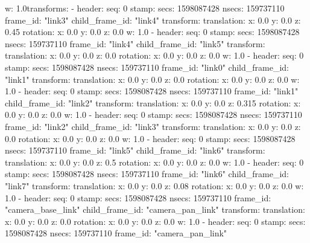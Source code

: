         w: 1.0transforms: 
  - 
    header: 
      seq: 0
      stamp: 
        secs: 1598087428
        nsecs: 159737110
      frame_id: "link3"
    child_frame_id: "link4"
    transform: 
      translation: 
        x: 0.0
        y: 0.0
        z: 0.45
      rotation: 
        x: 0.0
        y: 0.0
        z: 0.0
        w: 1.0
  - 
    header: 
      seq: 0
      stamp: 
        secs: 1598087428
        nsecs: 159737110
      frame_id: "link4"
    child_frame_id: "link5"
    transform: 
      translation: 
        x: 0.0
        y: 0.0
        z: 0.0
      rotation: 
        x: 0.0
        y: 0.0
        z: 0.0
        w: 1.0
  - 
    header: 
      seq: 0
      stamp: 
        secs: 1598087428
        nsecs: 159737110
      frame_id: "link0"
    child_frame_id: "link1"
    transform: 
      translation: 
        x: 0.0
        y: 0.0
        z: 0.0
      rotation: 
        x: 0.0
        y: 0.0
        z: 0.0
        w: 1.0
  - 
    header: 
      seq: 0
      stamp: 
        secs: 1598087428
        nsecs: 159737110
      frame_id: "link1"
    child_frame_id: "link2"
    transform: 
      translation: 
        x: 0.0
        y: 0.0
        z: 0.315
      rotation: 
        x: 0.0
        y: 0.0
        z: 0.0
        w: 1.0
  - 
    header: 
      seq: 0
      stamp: 
        secs: 1598087428
        nsecs: 159737110
      frame_id: "link2"
    child_frame_id: "link3"
    transform: 
      translation: 
        x: 0.0
        y: 0.0
        z: 0.0
      rotation: 
        x: 0.0
        y: 0.0
        z: 0.0
        w: 1.0
  - 
    header: 
      seq: 0
      stamp: 
        secs: 1598087428
        nsecs: 159737110
      frame_id: "link5"
    child_frame_id: "link6"
    transform: 
      translation: 
        x: 0.0
        y: 0.0
        z: 0.5
      rotation: 
        x: 0.0
        y: 0.0
        z: 0.0
        w: 1.0
  - 
    header: 
      seq: 0
      stamp: 
        secs: 1598087428
        nsecs: 159737110
      frame_id: "link6"
    child_frame_id: "link7"
    transform: 
      translation: 
        x: 0.0
        y: 0.0
        z: 0.08
      rotation: 
        x: 0.0
        y: 0.0
        z: 0.0
        w: 1.0
  - 
    header: 
      seq: 0
      stamp: 
        secs: 1598087428
        nsecs: 159737110
      frame_id: "camera_base_link"
    child_frame_id: "camera_pan_link"
    transform: 
      translation: 
        x: 0.0
        y: 0.0
        z: 0.0
      rotation: 
        x: 0.0
        y: 0.0
        z: 0.0
        w: 1.0
  - 
    header: 
      seq: 0
      stamp: 
        secs: 1598087428
        nsecs: 159737110
      frame_id: "camera_pan_link"
